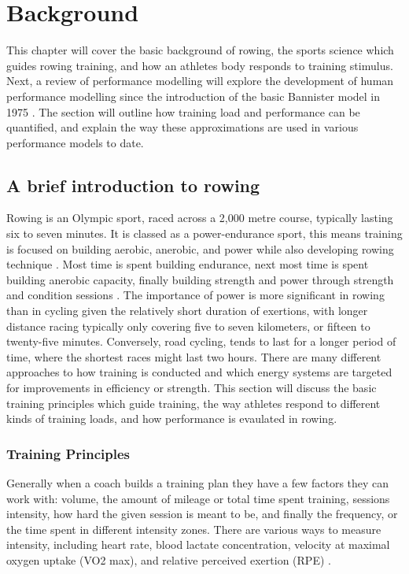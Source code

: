 \chapter{Background}
\label{chap:background}
This chapter will cover the basic background of rowing, the sports science which guides rowing training, and how an athletes body responds to training stimulus. Next, a review of performance modelling will explore the development of human performance modelling since the introduction of the basic Bannister model in 1975 \autocite{Bannister1976}. The section will outline how training load and performance can be quantified, and explain the way these approximations are used in various performance models to date.

\section{A brief introduction to rowing}
Rowing is an Olympic sport, raced across a 2,000 metre course, typically lasting six to seven minutes. It is classed as a power-endurance sport, this means training is focused on building aerobic, anerobic, and power while also developing rowing technique \autocite{Mäestu2005}. Most time is spent building endurance, next most time is spent building anerobic capacity, finally building strength and power through strength and condition sessions \autocite{Seiler2006}. The importance of power is more significant in rowing than in cycling given the relatively short duration of exertions, with longer distance racing typically only covering five to seven kilometers, or fifteen to twenty-five minutes. Conversely, road cycling, tends to last for a longer period of time, where the shortest races might last two hours. There are many different approaches to how training is conducted and which energy systems are targeted for improvements in efficiency or strength. This section will discuss the basic training principles which guide training, the way athletes respond to different kinds of training loads, and how performance is evaulated in rowing.

\subsection{Training Principles} \label{sub:training_principles}
Generally when a coach builds a training plan they have a few factors they can work with: volume, the amount of mileage or total time spent training, sessions intensity, how hard the given session is meant to be, and finally the frequency, or the time spent in different intensity zones. There are various ways to measure intensity, including heart rate, blood lactate concentration, velocity at maximal oxygen uptake (VO2 max), and relative perceived exertion (RPE) \autocite{Rosenblat2019}. 

